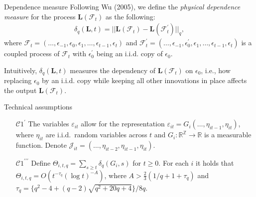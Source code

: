 \documentclass[10pt, handout]{beamer}
\newcommand{\reals}{\mathbb{R}}
\begin{document}
\begin{frame}{Dependence measure}
Following Wu (2005), we define the \textit{physical dependence measure} for the process $\boldsymbol{L}(\mathcal{F}_t)$ as the following:
\begin{align*}
 \delta_q(\boldsymbol{L}, t) = || \boldsymbol{L}(\mathcal{F}_t) - \boldsymbol{L}(\mathcal{F}_t^\prime) ||_q,
\end{align*}
where $\mathcal{F}_t  = (\ldots, \epsilon_{-1}, \epsilon_0, \epsilon_1, \ldots, \epsilon_{t-1}, \epsilon_t)$ and $\mathcal{F}_t^\prime  = (\ldots, \epsilon_{-1}, \epsilon^\prime_0, \epsilon_1, \ldots, \epsilon_{t-1}, \epsilon_t)$ is a coupled process of $\mathcal{F}_t$ with $\epsilon_0^\prime$ being an i.i.d. copy of $\epsilon_0$.\pause

Intuitively, $\delta_q(\boldsymbol{L}, t)$ measures the dependency of $\boldsymbol{L}(\mathcal{F}_t)$ on $\epsilon_0$, i.e., how replacing $\epsilon_0$ by an i.i.d. copy while keeping all other innovations in place affects the output $\boldsymbol{L}(\mathcal{F}_t)$.
\end{frame}

\begin{frame}[label=tech_assumptions]{Technical assumptions}
\begin{enumerate}

\item[$\mathcal{C}1^\prime$] The variables $\varepsilon_{it}$ allow for the representation $\varepsilon_{it} = G_i(\ldots,\eta_{it-1},\eta_{it})$, where $\eta_{it}$ are i.i.d.\ random variables across $t$ and $G_i: \mathbb{R}^\mathbb{Z} \rightarrow \reals$ is a measurable function. Denote $\mathcal{J}_{it} = (\ldots,\eta_{it-2},\eta_{it-1},\eta_{it})$.

\item[$\mathcal{C}1^{\prime\prime\prime}$]  Define $\Theta_{i, t,q} = \sum\nolimits_{s \ge t} \delta_q(G_i, s)$ for $t \ge 0$. For each $i$ it holds that \linebreak
$\Theta_{i, t,q} = O ( t^{-\tau_q} (\log t)^{-A} )$,  
where $A > \frac{2}{3} (1/q + 1 + \tau_q)$ and \linebreak $\tau_q = \{q^2 - 4 + (q-2) \sqrt{q^2 + 20q + 4}\} / 8q$. \hyperlink{frame_assumptions<3>}{}

\end{enumerate}

\end{frame}
\end{document}
